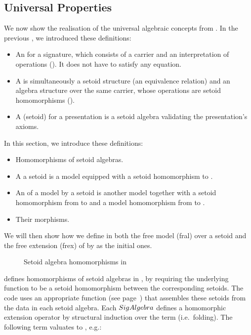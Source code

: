 \subsection{Universal Properties}
We now show the \idris{} realisation of the universal algebraic
concepts from . In the previous ,
we introduced these definitions:
\begin{itemize}
\item An  for a signature, which consists of a carrier
  and an interpretation of operations (). It does not
  have to satisfy any equation.
\item A  is simultaneously a setoid structure
  (an equivalence relation) and an algebra structure over the same
  carrier, whose operations are setoid homomorphisms ().
\item A (setoid)  for a presentation is a setoid
  algebra validating the presentation's axioms.
\end{itemize}
In this section, we introduce these definitions:
\begin{itemize}
\item Homomorphisms of setoid algebras.
\item A  a setoid \X{} is a model \A{}  equipped with a setoid
  homomorphism \X{} to \A{}.
\item An  of a model \A{} by a setoid \X{} is another
  model \A[2]{} together with a setoid homomorphism from \X{} to \A[2]{} and a
  model homomorphism from \A{} to \A[2].
\item Their morphisms.
\end{itemize}
We will then show how we define in \idris{} both the free model
(fral) over a setoid \X{} and the free extension (frex) of \A{} by
\X{} as the initial ones.


\begin{figure}
\caption{Setoid algebra homomorphisms in \Frexlib{}}
\end{figure}

\Frexlib{} defines homomorphisms of setoid algebras in , by
requiring the underlying function to be a setoid homomorphism between
the corresponding setoids. The code uses an appropriate
 function (see page~\pageref{cast explanation})
that assembles these setoids from the
data in each setoid algebra.
Each $\SigAlgebra$ defines a homomorphic extension operator
\AlgBind{}\AlgBindType{} by structural induction over the
term (i.e.~folding). The following term valuates to \BindExResult{}, e.g.:
\begin{center}
\BindEx{}
\end{center}


